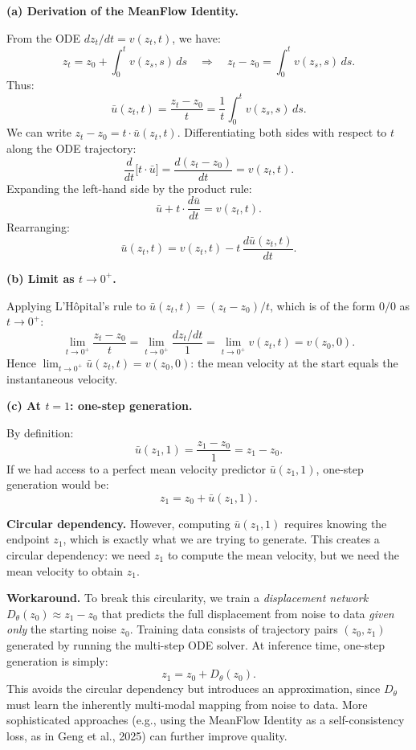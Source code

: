 \documentclass[11pt,a4paper]{article}
\begin{document}
\textbf{(a) Derivation of the MeanFlow Identity.}

From the ODE $dz_t/dt = v(z_t, t)$, we have:
\[
    z_t = z_0 + \int_0^t v(z_s, s)\, ds
    \quad \Longrightarrow \quad
    z_t - z_0 = \int_0^t v(z_s, s)\, ds.
\]
Thus:
\[
    \bar{u}(z_t, t) = \frac{z_t - z_0}{t} = \frac{1}{t}\int_0^t v(z_s, s)\, ds.
\]
We can write $z_t - z_0 = t \cdot \bar{u}(z_t, t)$. Differentiating both sides with respect to $t$ along the ODE trajectory:
\[
    \frac{d}{dt}\bigl[t \cdot \bar{u}\bigr] = \frac{d(z_t - z_0)}{dt} = v(z_t, t).
\]
Expanding the left-hand side by the product rule:
\[
    \bar{u} + t \cdot \frac{d\bar{u}}{dt} = v(z_t, t).
\]
Rearranging:
\[
    \boxed{\bar{u}(z_t, t) = v(z_t, t) - t\,\frac{d\bar{u}(z_t, t)}{dt}.}
\]

\textbf{(b) Limit as $t \to 0^+$.}

Applying L'H\^opital's rule to $\bar{u}(z_t, t) = (z_t - z_0)/t$, which is of the form $0/0$ as $t \to 0^+$:
\[
    \lim_{t \to 0^+} \frac{z_t - z_0}{t} = \lim_{t \to 0^+} \frac{dz_t/dt}{1} = \lim_{t \to 0^+} v(z_t, t) = v(z_0, 0).
\]
Hence $\lim_{t \to 0^+} \bar{u}(z_t, t) = v(z_0, 0)$: the mean velocity at the start equals the instantaneous velocity.

\textbf{(c) At $t=1$: one-step generation.}

By definition:
\[
    \bar{u}(z_1, 1) = \frac{z_1 - z_0}{1} = z_1 - z_0.
\]
If we had access to a perfect mean velocity predictor $\bar{u}(z_1, 1)$, one-step generation would be:
\[
    z_1 = z_0 + \bar{u}(z_1, 1).
\]

\textbf{Circular dependency.} However, computing $\bar{u}(z_1, 1)$ requires knowing the endpoint $z_1$, which is exactly what we are trying to generate. This creates a circular dependency: we need $z_1$ to compute the mean velocity, but we need the mean velocity to obtain $z_1$.

\textbf{Workaround.} To break this circularity, we train a \emph{displacement network} $D_\theta(z_0) \approx z_1 - z_0$ that predicts the full displacement from noise to data \emph{given only} the starting noise $z_0$. Training data consists of trajectory pairs $(z_0, z_1)$ generated by running the multi-step ODE solver. At inference time, one-step generation is simply:
\[
    z_1 = z_0 + D_\theta(z_0).
\]
This avoids the circular dependency but introduces an approximation, since $D_\theta$ must learn the inherently multi-modal mapping from noise to data. More sophisticated approaches (e.g., using the MeanFlow Identity as a self-consistency loss, as in Geng et al., 2025) can further improve quality.
\end{document}
